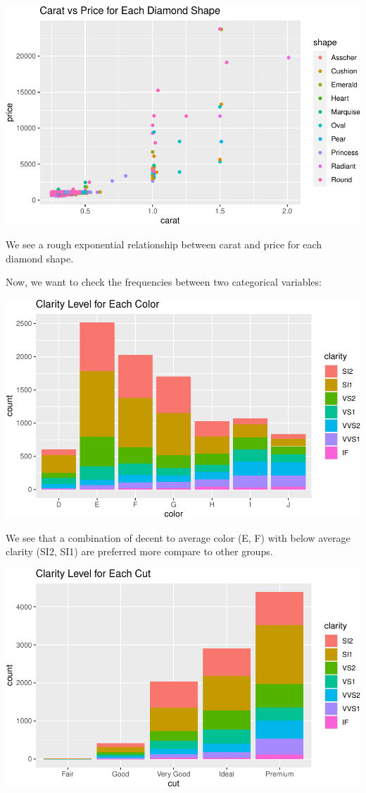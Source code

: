 \documentclass[
]{article}
\begin{document}
\begin{center}\includegraphics[width=0.8\linewidth]{Methods_and_Results_files/figure-latex/unnamed-chunk-16-1} \end{center}

We see a rough exponential relationship between carat and price for each
diamond shape.

Now, we want to check the frequencies between two categorical variables:

\begin{center}\includegraphics[width=0.8\linewidth]{Methods_and_Results_files/figure-latex/unnamed-chunk-17-1} \end{center}

We see that a combination of decent to average color (E, F) with below
average clarity (SI2, SI1) are preferred more compare to other groups.

\begin{center}\includegraphics[width=0.8\linewidth]{Methods_and_Results_files/figure-latex/unnamed-chunk-18-1} \end{center}
\end{document}
